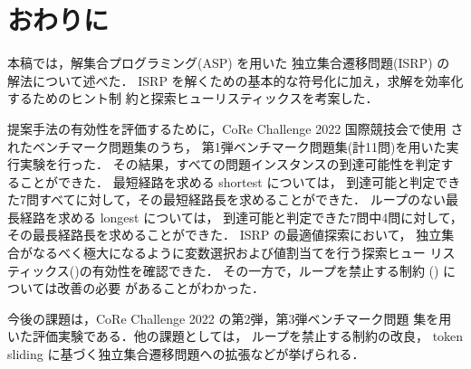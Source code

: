 \section{おわりに}\label{sec:conclusion}

本稿では，解集合プログラミング(ASP) を用いた 独立集合遷移問題(ISRP) の
解法について述べた．
ISRP を解くための基本的な符号化に加え，求解を効率化するためのヒント制
約と探索ヒューリスティックスを考案した．

提案手法の有効性を評価するために，CoRe Challenge 2022 国際競技会で使用
されたベンチマーク問題集のうち，
第1弾ベンチマーク問題集(計11問)を用いた実行実験を行った．
その結果，すべての問題インスタンスの到達可能性を判定することができた．
最短経路を求める shortest については，
到達可能と判定できた7問すべてに対して，その最短経路長を求めることができた．
ループのない最長経路を求める longest については，
到達可能と判定できた7問中4問に対して，その最長経路長を求めることができた．
ISRP の最適値探索において，
独立集合がなるべく極大になるように変数選択および値割当てを行う探索ヒュー
リスティックス()の有効性を確認できた．
その一方で，ループを禁止する制約 () については改善の必要
があることがわかった．

今後の課題は，CoRe Challenge 2022 の第2弾，第3弾ベンチマーク問題
集を用いた評価実験である．他の課題としては，
ループを禁止する制約の改良，
token sliding に基づく独立集合遷移問題への拡張などが挙げられる．

